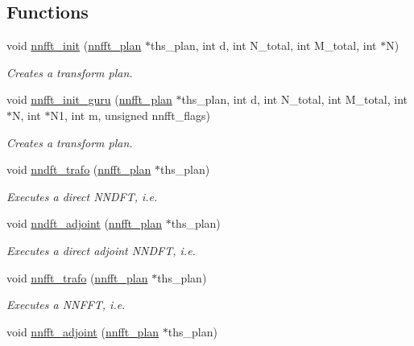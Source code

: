 \subsection*{Functions}
\begin{CompactItemize}
\item 
void \hyperlink{group__nnfft_ga0}{nnfft\_\-init} (\hyperlink{structnnfft__plan}{nnfft\_\-plan} $\ast$ths\_\-plan, int d, int N\_\-total, int M\_\-total, int $\ast$N)
\begin{CompactList}\small\item\em Creates a transform plan. \item\end{CompactList}\item 
void \hyperlink{group__nnfft_ga1}{nnfft\_\-init\_\-guru} (\hyperlink{structnnfft__plan}{nnfft\_\-plan} $\ast$ths\_\-plan, int d, int N\_\-total, int M\_\-total, int $\ast$N, int $\ast$N1, int m, unsigned nnfft\_\-flags)
\begin{CompactList}\small\item\em Creates a transform plan. \item\end{CompactList}\item 
void \hyperlink{group__nnfft_ga2}{nndft\_\-trafo} (\hyperlink{structnnfft__plan}{nnfft\_\-plan} $\ast$ths\_\-plan)
\begin{CompactList}\small\item\em Executes a direct NNDFT, i.e. \item\end{CompactList}\item 
void \hyperlink{group__nnfft_ga3}{nndft\_\-adjoint} (\hyperlink{structnnfft__plan}{nnfft\_\-plan} $\ast$ths\_\-plan)
\begin{CompactList}\small\item\em Executes a direct adjoint NNDFT, i.e. \item\end{CompactList}\item 
void \hyperlink{group__nnfft_ga4}{nnfft\_\-trafo} (\hyperlink{structnnfft__plan}{nnfft\_\-plan} $\ast$ths\_\-plan)
\begin{CompactList}\small\item\em Executes a NNFFT, i.e. \item\end{CompactList}\item 
void \hyperlink{group__nnfft_ga5}{nnfft\_\-adjoint} (\hyperlink{structnnfft__plan}{nnfft\_\-plan} $\ast$ths\_\-plan)

\end{CompactItemize}
